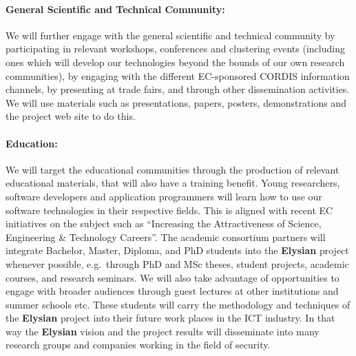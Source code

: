 \documentclass[a4paper,11pt]{article}
\newcommand{\project}[1]{\textbf{#1}\xspace}
\newcommand{\SECURITY}{\project{Elysian}}
\newcommand{\TheProject}{\SECURITY}
\begin{document}
\paragraph{General Scientific and Technical Community:}
We will further engage with the general scientific and technical community
 by participating in relevant workshops, conferences and clustering events (including ones which
 will develop our technologies beyond the bounds of our own research communities), by engaging with the
 different EC-sponsored CORDIS information channels, by presenting at trade
 fairs, and through other dissemination activities.  We will use materials such as presentations,
 papers,  posters, demonstrations and the project web site to do this.


\paragraph{Education:} We will target 
the educational communities through the production of relevant educational materials, that will
also have a training benefit. Young researchers, software
 developers and application programmers will learn how to
 use our software technologies in their
 respective fields. This is aligned with recent EC
 initiatives on the subject such as ``Increasing the Attractiveness
 of Science, Engineering \& Technology Careers''.
 The academic consortium partners will integrate Bachelor,
 Master, Diploma, and PhD students into the \TheProject{}
 project whenever possible, e.g.~through PhD and MSc theses, student
 projects, academic courses, and research seminars. 
 We will also take advantage of opportunities to engage with broader
 audiences through guest lectures at other institutions and summer schools etc.
 These students will
 carry the methodology and techniques of the \TheProject{}
 project into their future work places in the ICT industry.
 In that way the \TheProject{} vision and the project
 results will disseminate into many research groups and
 companies working in the field of security. 
\end{document}
